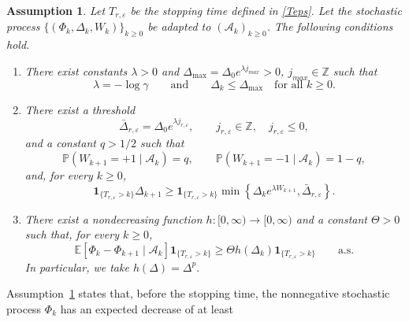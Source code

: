 \documentclass[11pt,a4paper]{article}
\newtheorem{assumption}{Assumption}[section]
\newcommand{\Dexp}{p}
\newcommand{\goldelta}{r}
\begin{document}
\begin{assumption}
\label{ass:5}
Let \(T_{\goldelta,\varepsilon}\) be the stopping time defined in
\eqref{Teps}. Let the stochastic process \(\{(\Phi_k,\Delta_k,W_k)\}_{k\ge0}\) be adapted to
\((\mathcal A_k)_{k\ge0}\). The following conditions hold.

\begin{enumerate}
    \item[(i)] There exist constants \(\lambda>0\) and
    \(\Delta_{\max}= \Delta_0 e^{\lambda j_{max}}>0\), \(j_{max}\in\mathbb Z\) such that
    \[
        \lambda=-\log\gamma
        \qquad\text{and}\qquad
        \Delta_k\le \Delta_{\max}
        \quad\text{for all }k\ge0.
    \]

    \item[(ii)] There exist a threshold
    \[
        \bar\Delta_{\goldelta,\varepsilon}
        =
        \Delta_0 e^{\lambda j_{\goldelta,\varepsilon}},
        \qquad
        j_{\goldelta,\varepsilon}\in\mathbb Z,
        \quad j_{\goldelta,\varepsilon}\le 0,
    \]
    and a constant \(q>1/2\) such that
    \[
        \mathbb P(W_{k+1}=+1\mid \mathcal A_k)= q,
        \qquad
        \mathbb P(W_{k+1}=-1\mid \mathcal A_k)= 1-q,
    \]
    and, for every \(k\ge0\),
    \begin{equation}
    \label{eq:dynamics}
        \mathbf 1_{\{T_{\goldelta,\varepsilon}>k\}}
        \Delta_{k+1}
        \ge
        \mathbf 1_{\{T_{\goldelta,\varepsilon}>k\}}
        \min\left\{
            \Delta_k e^{\lambda W_{k+1}},
            \bar\Delta_{\goldelta,\varepsilon}
        \right\}.
    \end{equation}

    \item[(iii)] There exist a nondecreasing function
    \(h:[0,\infty)\to [0,\infty)\) and a constant \(\Theta>0\) such that,
    for every \(k\ge0\),
    \begin{equation}
    \label{eq:abstract_drift}
        \mathbb E[
            \Phi_k-\Phi_{k+1}
            \mid
            \mathcal A_k
        ]
        \mathbf 1_{\{T_{\goldelta,\varepsilon}>k\}}
        \ge
        \Theta h(\Delta_k)
        \mathbf 1_{\{T_{\goldelta,\varepsilon}>k\}}
        \qquad\text{a.s.}
    \end{equation}
    In particular, we take
    $h(\Delta)=\Delta^{\Dexp}. $
\end{enumerate}
\end{assumption}
Assumption~\ref{ass:5} states that, before the stopping time, the
nonnegative stochastic process \(\Phi_k\) has an expected decrease of at least
\end{document}
